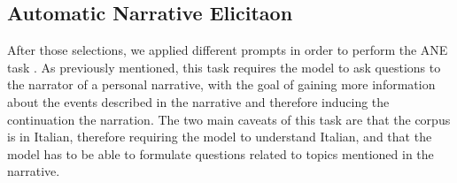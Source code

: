 
\subsection{Automatic Narrative Elicitaon}
\label{cha:methodology-personal-narrative-elicitation}
After those selections, we applied different prompts in order to perform the ANE task %
. As previously mentioned, this task requires the model to ask questions to the narrator of a personal narrative, with the goal of gaining more information about the events described in the narrative and therefore inducing the continuation the narration. The two main caveats of this task are that the corpus is in Italian, therefore requiring the model to understand Italian, and that the model has to be able to formulate questions related to topics mentioned in the narrative. 


